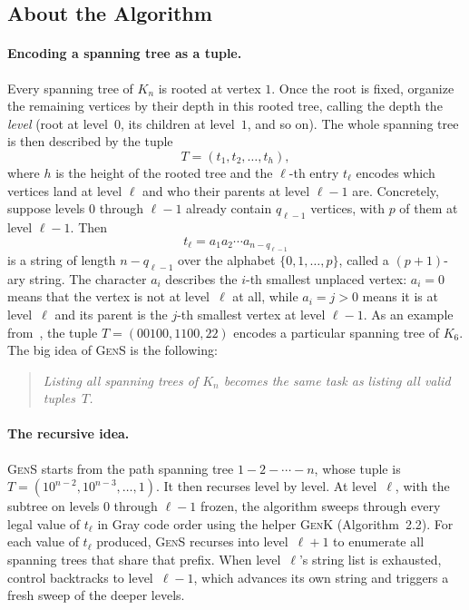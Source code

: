\documentclass{article}
\begin{document}
\subsection{About the Algorithm}

\paragraph{Encoding a spanning tree as a tuple.}
Every spanning tree of $K_n$ is rooted at vertex $1$. Once the root is fixed, organize the remaining vertices by their depth in this rooted tree, calling the depth the \emph{level} (root at level~$0$, its children at level~$1$, and so on). The whole spanning tree is then described by the tuple
\[
T = (t_1, t_2, \ldots, t_h),
\]
where $h$ is the height of the rooted tree and the $\ell$-th entry $t_\ell$ encodes which vertices land at level $\ell$ and who their parents at level $\ell-1$ are. Concretely, suppose levels $0$ through $\ell-1$ already contain $q_{\ell-1}$ vertices, with $p$ of them at level $\ell-1$. Then
\[
t_\ell = a_1 a_2 \cdots a_{n-q_{\ell-1}}
\]
is a string of length $n-q_{\ell-1}$ over the alphabet $\{0,1,\ldots,p\}$, called a $(p+1)$-ary string. The character $a_i$ describes the $i$-th smallest unplaced vertex: $a_i=0$ means that the vertex is not at level~$\ell$ at all, while $a_i=j>0$ means it is at level~$\ell$ and its parent is the $j$-th smallest vertex at level $\ell-1$. As an example from~\cite{liu2026}, the tuple $T=(00100,1100,22)$ encodes a particular spanning tree of $K_6$. The big idea of \textsc{GenS} is the following:
\begin{quote}
\emph{Listing all spanning trees of $K_n$ becomes the same task as listing all valid tuples~$T$.}
\end{quote}

\paragraph{The recursive idea.}
\textsc{GenS} starts from the path spanning tree $1{-}2{-}\cdots{-}n$, whose tuple is $T=(10^{n-2}, 10^{n-3}, \ldots, 1)$. It then recurses level by level. At level~$\ell$, with the subtree on levels $0$ through $\ell-1$ frozen, the algorithm sweeps through every legal value of $t_\ell$ in Gray code order using the helper \textsc{GenK} (Algorithm~2.2). For each value of $t_\ell$ produced, \textsc{GenS} recurses into level~$\ell+1$ to enumerate all spanning trees that share that prefix. When level~$\ell$'s string list is exhausted, control backtracks to level~$\ell-1$, which advances its own string and triggers a fresh sweep of the deeper levels.
\end{document}
